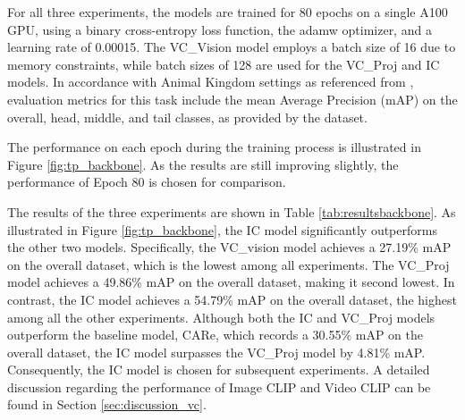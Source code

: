 For all three experiments, the models are trained for 80 epochs on a single A100 GPU, using a binary cross-entropy loss function, the adamw optimizer, and a learning rate of 0.00015. The VC\_Vision model employs a batch size of 16 due to memory constraints, while batch sizes of 128 are used for the VC\_Proj and IC models. In accordance with Animal Kingdom settings as referenced from \parencite{ng2022animal}, evaluation metrics for this task include the mean Average Precision (mAP) on the overall, head, middle, and tail classes, as provided by the dataset. 


The performance on each epoch during the training process is illustrated in Figure \ref{fig:tp_backbone}. As the results are still improving slightly, the performance of Epoch 80 is chosen for comparison. 

The results of the three experiments are shown in Table \ref{tab:resultsbackbone}. As illustrated in Figure \ref{fig:tp_backbone}, the IC model significantly outperforms the other two models. Specifically, the VC\_vision model achieves a 27.19\% mAP on the overall dataset, which is the lowest among all experiments. The VC\_Proj model achieves a 49.86\% mAP on the overall dataset, making it second lowest. In contrast, the IC model achieves a 54.79\% mAP on the overall dataset, the highest among all the other experiments. Although both the IC and VC\_Proj models outperform the baseline model, CARe, which records a 30.55\% mAP on the overall dataset, the IC model surpasses the VC\_Proj model by 4.81\% mAP. Consequently, the IC model is chosen for subsequent experiments. A detailed discussion regarding the performance of Image CLIP and Video CLIP can be found in Section \ref{sec:discussion_vc}.

